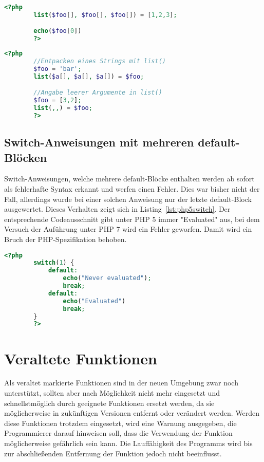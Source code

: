     \begin{lstlisting}[language=php, caption={Beispiel der Verwendung von list()}, label={lst:php5list}]
        <?php
        list($foo[], $foo[], $foo[]) = [1,2,3];

        echo($foo[0])
        ?>
    \end{lstlisting}

    \begin{lstlisting}[language=php, caption={Beispiel unerlaubter Verwendungen von list()}, label={lst:php5list1}]
        <?php
        //Entpacken eines Strings mit list()
        $foo = 'bar';
        list($a[], $a[], $a[]) = $foo;

        //Angabe leerer Argumente in list()
        $foo = [3,2];
        list(,,) = $foo;
        ?>
    \end{lstlisting}

    \subsection{Switch-Anweisungen mit mehreren default-Blöcken}\label{switch}
    Switch-Anweisungen, welche mehrere default-Blöcke enthalten werden ab sofort als fehlerhafte Syntax erkannt und werfen einen Fehler. Dies war bisher nicht der Fall,
    allerdings wurde bei einer solchen Anweisung nur der letzte default-Block ausgewertet. Dieses Verhalten zeigt sich in Listing~\ref{lst:php5switch}. Der entsprechende
    Codeausschnitt gibt unter \acs{PHP} 5 immer "Evaluated" aus, bei dem Versuch der Auführung unter \acs{PHP} 7 wird ein Fehler geworfen. Damit wird ein Bruch der
    \acs{PHP}-Spezifikation \cite{php_group_php_nodate} behoben.

    \begin{lstlisting}[language=php, caption={Beispiel meherer default-Blöcke in Switch-Anweisungen}, label={lst:php5switch}]
        <?php
        switch(1) {
            default:
                echo("Never evaluated");
                break;
            default:
                echo("Evaluated")
                break;
        }
        ?>
    \end{lstlisting}


\section{Veraltete Funktionen}
Als veraltet markierte Funktionen sind in der neuen Umgebung zwar noch unterstützt, sollten aber nach Möglichkeit nicht mehr eingesetzt und schnellstmöglich durch geeignete 
Funktionen ersetzt werden, da sie möglicherweise in zukünftigen Versionen entfernt oder verändert werden. Werden diese Funktionen trotzdem eingesetzt, wird eine Warnung 
ausgegeben, die Programmierer darauf hinweisen soll, dass die Verwendung der Funktion möglicherweise gefährlich sein kann. Die Lauffähigkeit des Programms wird bis zur 
abschließenden Entfernung der Funktion jedoch nicht beeinflusst. \cite{oracle_how_2004}
